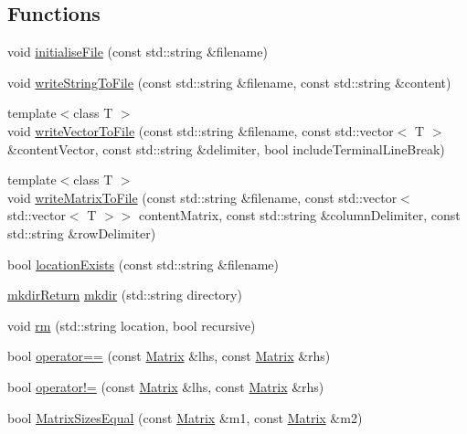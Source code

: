 \subsection*{Functions}
\begin{DoxyCompactItemize}
\item 
void \hyperlink{namespaceJSL_a47d8cb112d513ee5a3ae38ca6a89743d}{initialise\+File} (const std\+::string \&filename)
\item 
void \hyperlink{namespaceJSL_a838b3a913896993bc008408d164ec19d}{write\+String\+To\+File} (const std\+::string \&filename, const std\+::string \&content)
\item 
{\footnotesize template$<$class T $>$ }\\void \hyperlink{namespaceJSL_a1d611217d83275af846cbc091ff98f53}{write\+Vector\+To\+File} (const std\+::string \&filename, const std\+::vector$<$ T $>$ \&content\+Vector, const std\+::string \&delimiter, bool include\+Terminal\+Line\+Break)
\item 
{\footnotesize template$<$class T $>$ }\\void \hyperlink{namespaceJSL_a8c08233b0cb834d4dcde1153b4b8c8c7}{write\+Matrix\+To\+File} (const std\+::string \&filename, const std\+::vector$<$ std\+::vector$<$ T $>$$>$ content\+Matrix, const std\+::string \&column\+Delimiter, const std\+::string \&row\+Delimiter)
\item 
bool \hyperlink{namespaceJSL_a1752cd7c6e1134da51e9307527e0d788}{location\+Exists} (const std\+::string \&filename)
\item 
\hyperlink{structJSL_1_1mkdirReturn}{mkdir\+Return} \hyperlink{namespaceJSL_abf525d02b8c49f21ef7faa68b7571f93}{mkdir} (std\+::string directory)
\item 
void \hyperlink{namespaceJSL_ae48b92e64fb9d321121df976b770efa6}{rm} (std\+::string location, bool recursive)
\item 
bool \hyperlink{namespaceJSL_a682c8bb3fff54370f38dcb16794fc7c5}{operator==} (const \hyperlink{classJSL_1_1Matrix}{Matrix} \&lhs, const \hyperlink{classJSL_1_1Matrix}{Matrix} \&rhs)
\item 
bool \hyperlink{namespaceJSL_a8b19814a4b6cb667d1e27133acc38513}{operator!=} (const \hyperlink{classJSL_1_1Matrix}{Matrix} \&lhs, const \hyperlink{classJSL_1_1Matrix}{Matrix} \&rhs)
\item 
bool \hyperlink{namespaceJSL_a38d1bbf23dc57ec028ea8d91a9688957}{Matrix\+Sizes\+Equal} (const \hyperlink{classJSL_1_1Matrix}{Matrix} \&m1, const \hyperlink{classJSL_1_1Matrix}{Matrix} \&m2)
\item 
$$
\end{DoxyCompactItemize}
